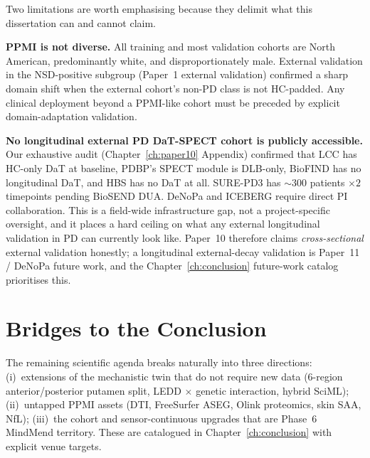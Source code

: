 Two limitations are worth emphasising because they delimit what this dissertation can and cannot claim.

\textbf{PPMI is not diverse.} All training and most validation cohorts are North American, predominantly white, and disproportionately male. External validation in the NSD-positive subgroup (Paper~1 external validation) confirmed a sharp domain shift when the external cohort's non-PD class is not HC-padded. Any clinical deployment beyond a PPMI-like cohort must be preceded by explicit domain-adaptation validation.

\textbf{No longitudinal external PD DaT-SPECT cohort is publicly accessible.} Our exhaustive audit (Chapter~\ref{ch:paper10} Appendix) confirmed that LCC has HC-only DaT at baseline, PDBP's SPECT module is DLB-only, BioFIND has no longitudinal DaT, and HBS has no DaT at all. SURE-PD3 has $\sim 300$ patients $\times 2$ timepoints pending BioSEND DUA. DeNoPa and ICEBERG require direct PI collaboration. This is a field-wide infrastructure gap, not a project-specific oversight, and it places a hard ceiling on what any external longitudinal validation in PD can currently look like. Paper~10 therefore claims \emph{cross-sectional} external validation honestly; a longitudinal external-decay validation is Paper~11 / DeNoPa future work, and the Chapter~\ref{ch:conclusion} future-work catalog prioritises this.

\section{Bridges to the Conclusion}
\label{sec:disc-bridges}

The remaining scientific agenda breaks naturally into three directions: (i)~extensions of the mechanistic twin that do not require new data (6-region anterior/posterior putamen split, LEDD $\times$ genetic interaction, hybrid SciML); (ii)~untapped PPMI assets (DTI, FreeSurfer ASEG, Olink proteomics, skin SAA, NfL); (iii)~the cohort and sensor-continuous upgrades that are Phase~6 MindMend territory. These are catalogued in Chapter~\ref{ch:conclusion} with explicit venue targets.
